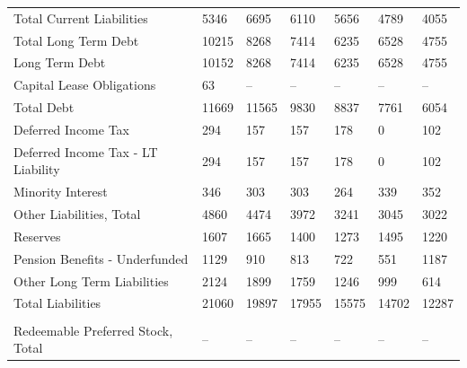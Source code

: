 \documentclass[grad,numbers]{coppe}
\begin{document}
\begin{longtable}[t]{lllllll}
  \hspace{1em}Total Current Liabilities & 5346 & 6695 & 6110 & 5656 & 4789 & 4055\\
  \hspace{1em}Total Long Term Debt & 10215 & 8268 & 7414 & 6235 & 6528 & 4755\\
  \hspace{1em}\hspace{1em}Long Term Debt & 10152 & 8268 & 7414 & 6235 & 6528 & 4755\\
  \hspace{1em}\hspace{1em}Capital Lease Obligations & 63 & -- & -- & -- & -- & --\\
  \hspace{1em}Total Debt & 11669 & 11565 & 9830 & 8837 & 7761 & 6054\\
  \hspace{1em}Deferred Income Tax & 294 & 157 & 157 & 178 & 0 & 102\\
  \hspace{1em}\hspace{1em}Deferred Income Tax - LT Liability & 294 & 157 & 157 & 178 & 0 & 102\\
  \hspace{1em}Minority Interest & 346 & 303 & 303 & 264 & 339 & 352\\
  \hspace{1em}Other Liabilities, Total & 4860 & 4474 & 3972 & 3241 & 3045 & 3022\\
  \hspace{1em}\hspace{1em}Reserves & 1607 & 1665 & 1400 & 1273 & 1495 & 1220\\
  \hspace{1em}\hspace{1em}Pension Benefits - Underfunded & 1129 & 910 & 813 & 722 & 551 & 1187\\
  \hspace{1em}\hspace{1em}Other Long Term Liabilities & 2124 & 1899 & 1759 & 1246 & 999 & 614\\
  \hspace{1em}Total Liabilities & 21060 & 19897 & 17955 & 15575 & 14702 & 12287\\
  \addlinespace[0.3em]
  \multicolumn{7}{l}{\textbf{Shareholders' Equity}}\\
  \hspace{1em}Redeemable Preferred Stock, Total & -- & -- & -- & -- & -- & --\\

\end{longtable}
\end{document}
